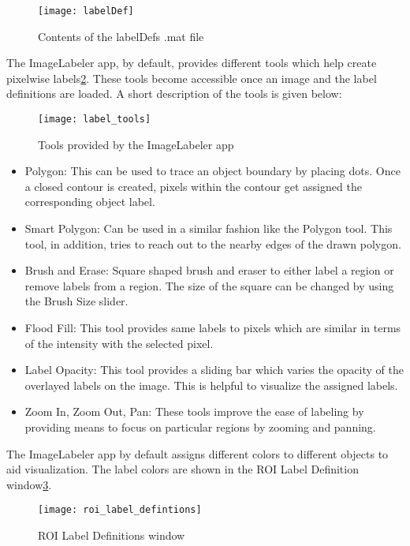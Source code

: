 \documentclass[paper=a4,11pt,parskip=half,toc=listof]{scrartcl}
\begin{document}
	\begin{figure}[htb!]
		\centering
		\texttt{[image: labelDef]}
		\caption{Contents of the labelDefs .mat file}
		\label{Fig:labeldef}
	\end{figure}
	
The ImageLabeler app, by default, provides different tools which help create pixelwise labels\ref{Fig:IL_tools}. These tools become accessible once an image and the label definitions are loaded. A short description of the tools is given below:
	\begin{figure}[htb!]
		\centering
		\texttt{[image: label\_tools]}
		\caption{Tools provided by the ImageLabeler app}
		\label{Fig:IL_tools}
	\end{figure}
	
	\begin{itemize}
		\item Polygon: This can be used to trace an object boundary by placing dots. Once a closed contour is created, pixels within the contour get assigned the corresponding object label.
		\item Smart Polygon: Can be used in a similar fashion like the Polygon tool. This tool, in addition, tries to reach out to the nearby edges of the drawn polygon.
		\item Brush and Erase: Square shaped brush and eraser to either label a region or remove labels from a region. The size of the square can be changed by using the Brush Size slider.
		\item Flood Fill: This tool provides same labels to pixels which are similar in terms of the intensity with the selected pixel.
		\item Label Opacity: This tool provides a sliding bar which varies the opacity of the overlayed labels on the image. This is helpful to visualize the assigned labels.
		\item Zoom In, Zoom Out, Pan: These tools improve the ease of labeling by providing means to focus on particular regions by zooming and panning.
	\end{itemize}
	
The ImageLabeler app by default assigns different colors to different objects to aid visualization. The label colors are shown in the ROI Label Definition window\ref{Fig:ROI}.
	\begin{figure}[htb!]
		\centering
		\texttt{[image: roi\_label\_defintions]}
		\caption{ROI Label Definitions window}
		\label{Fig:ROI}
	\end{figure}
	
\end{document}
